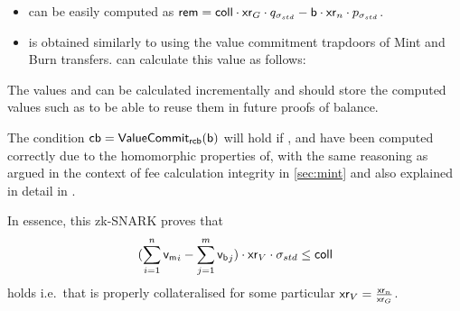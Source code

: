 \begin{itemize}
\begin{itemize}
        \item \rem can be easily computed as $\mathsf{rem} = \mathsf{coll} \cdot \mathsf{xr}_G \cdot q_{\sigma_{std}} - \mathsf{b} \cdot \mathsf{xr}_n \cdot p_{\sigma_{std}}$.
        
        \item \rcb is obtained similarly to \bal using the value commitment trapdoors of Mint and Burn transfers. \vault can calculate this value as follows:
    \end{itemize}
    
    The values \bal and \rcb can be calculated incrementally and \vault should store the computed values such as to be able to reuse them in future proofs of balance.
    
    The condition $\mathsf{cb} = \mathsf{ValueCommit}_{\mathsf{rcb}}(\mathsf{b})$ will hold if \cb, \rcv and \bal have been computed correctly due to the homomorphic properties of\break \vcm, with the same reasoning as argued in the context of fee calculation integrity in \cref{sec:mint} and also explained in detail in \cite[Section 4.12]{hopwood2016zcash}.
    
    In essence, this zk-SNARK proves that
    \begin{equation*}
        (\sum_{i=1}^{n} {\mathsf{v}_{\mathsf{m}}}_i - \sum_{j=1}^{m} {\mathsf{v}_{\mathsf{b}}}_j) \cdot \mathsf{xr}_V \cdot \sigma_{std} \leq \mathsf{coll}
    \end{equation*}
    holds i.e.\ that \vault is properly collateralised for some particular $\mathsf{xr}_V = \frac{\mathsf{xr}_n}{\mathsf{xr}_{G}}$.
\end{itemize}

